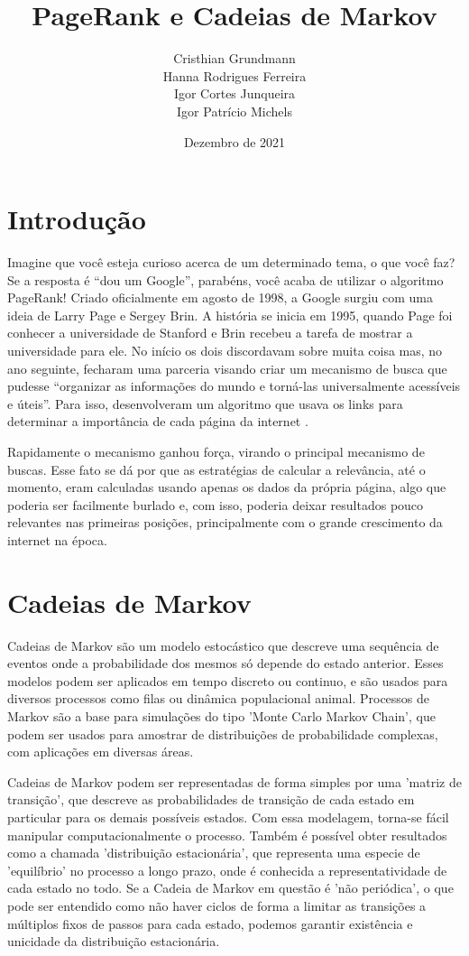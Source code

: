 \documentclass{article}
\title{PageRank e Cadeias de Markov}
\author{Cristhian Grundmann \\
Hanna Rodrigues Ferreira \\
Igor Cortes Junqueira \\
Igor Patrício Michels}
\date{Dezembro de 2021}
\begin{document}
\maketitle

\section*{Introdução}

Imagine que você esteja curioso acerca de um determinado tema, o que você faz? Se a resposta é ``dou um Google'', parabéns, você acaba de utilizar o algoritmo PageRank! Criado oficialmente em agosto de 1998, a Google surgiu com uma ideia de Larry Page e Sergey Brin. A história se inicia em 1995, quando Page foi conhecer a universidade de Stanford e Brin recebeu a tarefa de mostrar a universidade para ele. No início os dois discordavam sobre muita coisa mas, no ano seguinte, fecharam uma parceria visando criar um mecanismo de busca que pudesse ``organizar as informações do mundo e torná-las universalmente acessíveis e úteis''. Para isso, desenvolveram um algoritmo que usava os links para determinar a importância de cada página da internet \cite{google}.

Rapidamente o mecanismo ganhou força, virando o principal mecanismo de buscas. Esse fato se dá por que as estratégias de calcular a relevância, até o momento, eram calculadas usando apenas os dados da própria página, algo que poderia ser facilmente burlado e, com isso, poderia deixar resultados pouco relevantes nas primeiras posições, principalmente com o grande crescimento da internet na época.

\section*{Cadeias de Markov}

Cadeias de Markov são um modelo estocástico que descreve uma sequência de eventos onde a probabilidade dos mesmos só depende do estado anterior. Esses modelos podem ser aplicados em tempo discreto ou continuo, e são usados para diversos processos como filas ou dinâmica populacional animal. Processos de Markov são a base para simulações do tipo 'Monte Carlo Markov Chain', que podem ser usados para amostrar de distribuições de probabilidade complexas, com aplicações em diversas áreas.

Cadeias de Markov podem ser representadas de forma simples por uma 'matriz de transição', que descreve as probabilidades de transição de cada estado em particular para os demais possíveis estados. Com essa modelagem, torna-se fácil manipular computacionalmente o processo. Também é possível obter resultados como a chamada 'distribuição estacionária', que representa uma especie de 'equilíbrio' no processo a longo prazo, onde é conhecida a representatividade de cada estado no todo. Se a Cadeia de Markov em questão é 'não periódica', o que pode ser entendido como não haver ciclos de forma a limitar as transições a múltiplos fixos de passos para cada estado, podemos garantir existência e unicidade da distribuição estacionária.
\end{document}
